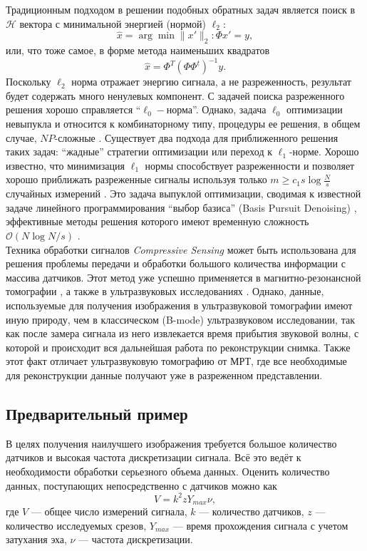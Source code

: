 \documentclass[14pt]{matmex-diploma}
\begin{document}
Традиционным подходом в решении подобных обратных задач является поиск в $\mathcal{H}$ вектора с минимальной энергией (нормой)  $\ell_2$: $$ \hat{x} = \arg\!\min{\| x'\|_2} : \Phi x' = y,$$ или, что тоже самое, в форме метода наименьших квадратов
$$\hat{x} = \Phi^T (\Phi\Phi^t)^{-1}y.$$
Поскольку $\ell_2$ норма  отражает энергию сигнала, а не разреженность, результат будет содержать много ненулевых компонент. С задачей поиска разреженного решения хорошо справляется ``$\ell_0-$норма''. Однако, задача $\ell_0$ оптимизации невыпукла и относится к комбинаторному типу, процедуры ее решения, в общем случае, $NP$-сложные \cite{natarajan1995sparse}. Существует два подхода для приближенного решения таких задач: ``жадные'' стратегии оптимизации\cite{mallat1993matching} или переход к $\ell_1$-норме. Хорошо известно, что минимизация $\ell_1$ нормы способствует разреженности \cite{donoho2006most} и позволяет хорошо приближать разреженные сигналы используя только $m \geq c_1 s \log{\frac{N}{s}}$ случайных измерений \cite{donoho2006compressed}\cite{candes2006robust}. Это задача выпуклой оптимизации, сводимая к известной задаче линейного программирования ``выбор базиса'' (Basis Pursuit Denoising) \cite{chen2001atomic}, эффективные методы решения которого имеют временную сложность $\mathcal{O}(N\log{N/s})$ \cite{berinde2008practical}.\\

Техника обработки сигналов \textit{Compressive Sensing} может быть использована для решения проблемы передачи и обработки большого количества информации с массива датчиков. Этот метод уже успешно применяется в магнитно-резонансной томографии \cite{lustig2007sparse, lustig2008compressed}, а также в ультразвуковых исследованиях \cite{quinsac2010compressed}. Однако, данные, используемые для получения изображения в ультразвуковой томографии имеют иную природу, чем в классическом (B-mode) ультразвуковом исследовании, так как после замера сигнала из него извлекается время прибытия звуковой волны, с которой и происходит вся дальнейшая работа по реконструкции снимка. Также этот факт отличает ультразвуковую томографию от МРТ, где все необходимые для реконструкции данные получают уже в разреженном представлении.

\subsection{Предварительный пример}

В целях получения наилучшего изображения требуется большое количество датчиков и высокая частота дискретизации сигнала. Всё это ведёт к необходимости обработки серьезного объема данных. Оценить количество данных, поступающих непосредственно с датчиков можно как
\[ V = k^2  z  Y_{max} \nu,   \]
где $V$ --- общее число измерений сигнала, $k$ --- количество датчиков, $z$ --- количество исследуемых срезов, $Y_{max}$ --- время прохождения сигнала с учетом затухания эха, $\nu$ --- частота дискретизации. \\
\end{document}
